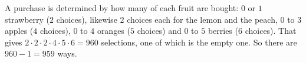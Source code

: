 A purchase is determined by how many of each fruit are bought: $0$ or $1$ strawberry ($2$ choices), likewise $2$ choices each for the lemon and the peach, $0$ to $3$ apples ($4$ choices), $0$ to $4$ oranges ($5$ choices) and $0$ to $5$ berries ($6$ choices). That gives $2\cdot2\cdot2\cdot4\cdot5\cdot6=960$ selections, one of which is the empty one. So there are $960-1=\boxed{959}$ ways.
